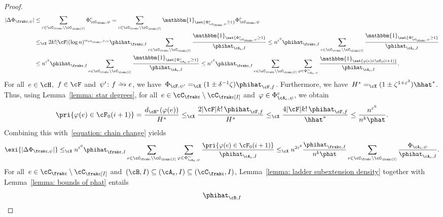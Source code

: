 \documentclass[11pt]{amsart}
\newcommand{\eps}{\varepsilon}
\DeclarePairedDelimiter{\abs}{\lvert}{\rvert}
\newcommand{\ind}{\mathbbm{1}}
\newcommand{\Xleq}{\leq_{\cX}}
\newcommand{\Xeq}{=_{\cX}}
\def\phi{\varphi}
\newcommand{\bijection}{\mathchoice
	{\xrightarrow{\smash{\raisebox{-3pt}{$\scriptstyle\sim$}}}}%
	{\xrightarrow{\smash{\raisebox{-3pt}{$\scriptstyle\sim$}}}}%
	{\xrightarrow{\smash{\raisebox{-2.5pt}{$\scriptscriptstyle\sim$}}}}%
	{\xrightarrow{\smash{\raisebox{-2.5pt}{$\scriptscriptstyle\sim$}}}}%
}
\theoremstyle{definition}
\numberwithin{equation}{section}
\begin{document}
\begin{proof}
\begin{equation}
\begin{aligned}
				\abs{ \Delta\Phi_{\frakc,\psi}}
				&\leq \sum_{e\in \cC_\frakc\setminus \cC_\frakc[I]} \Phi_{\cC_\frakc,\psi}^e
				=\sum_{e\in \cC_\frakc\setminus \cC_\frakc[I]} \ind_{\set{ \Phi_{\cC_\frakc,\psi}^e\geq 1 }}\Phi_{\cC_\frakc,\psi}^e\\
				&\Xleq 2k!\abs{\cF}(\log n)^{\alpha_{\cC_\frakc,I\cup e}}\phihat_{\frakc,I}\sum_{e\in \cC_\frakc\setminus \cC_\frakc[I]} \frac{\ind_{\set{ \Phi_{\cC_\frakc,\psi}^e\geq 1 }}}{\phihat_{\cA_e,I}}
				\leq n^{\eps^6}\phihat_{\frakc,I}\sum_{e\in \cC_\frakc\setminus \cC_\frakc[I]} \frac{\ind_{\set{ \Phi_{\cC_\frakc,\psi}^e\geq 1 }}}{\phihat_{\cA_e,I}}\\
				&\leq n^{\eps^6}\phihat_{\frakc,I}\sum_{e\in \cC_\frakc\setminus \cC_\frakc[I]} \frac{\ind_{\set{ \Phi_{\cA_e,\psi}^e\geq 1 }}}{\phihat_{\cA_e,I}}
				\leq n^{\eps^6}\phihat_{\frakc,I}\sum_{e\in \cC_\frakc\setminus \cC_\frakc[I]} \sum_{\phi\in\Phi^\sim_{\cA_e,\psi}}\frac{\ind_{\set{ \phi(e)\in \cF_0(i+1)  }}}{\phihat_{\cA_e,I}}.
			\end{aligned}
		\end{equation}
		For all~$e\in\cH$,~$f\in\cF$ and~$\psi'\colon f\bijection e$, we have~$\Phi_{\cF,\psi'}\Xeq (1\pm\delta^{-1}\zeta)\phihat_{\cF,f}$.
		Furthermore, we have~$H^*\Xeq (1\pm \zeta^{1+\eps^3})\hhat^*$.
		Thus, using Lemma~\ref{lemma: star degrees}, for all~$e\in\cC_\frakc\setminus\cC_\frakc[I]$ and~$\phi\in\Phi_{\cA_e,\psi}^e$, we obtain
		\begin{equation*}
			\pri{ \phi(e)\in \cF_0(i+1)  }
			=\frac{d_{\cH^*}(\phi(e))}{H^*}
			\Xleq \frac{2\abs{\cF}k!\,\phihat_{\cF,f}}{H^*}
			\Xleq \frac{4\abs{\cF}k!\,\phihat_{\cF,f}}{\hhat^*}
			\leq \frac{n^{\eps^6}}{n^k\phat}.
		\end{equation*}
		Combining this with~\eqref{equation: chain change} yields
		\begin{equation*}
			\exi{\abs{ \Delta\Phi_{\frakc,\psi}}}
			\Xleq n^{\eps^6}\phihat_{\frakc,I}\sum_{e\in \cC_\frakc\setminus \cC_\frakc[I]} \sum_{\phi\in\Phi^\sim_{\cA_e,\psi}}\frac{\pri{ \phi(e)\in \cF_0(i+1)  }}{\phihat_{\cA_e,I}}
			\Xleq n^{2\eps^6}\frac{\phihat_{\frakc,I}}{n^k\phat}\sum_{e\in \cC_\frakc\setminus \cC_\frakc[I]}\frac{\Phi_{\cA_e,\psi}}{\phihat_{\cA_e,I}}.
		\end{equation*}
		For all~$e\in\cC_\frakc\setminus\cC_\frakc[I]$ and~$(\cB,I)\subseteq(\cA_e,I)\subseteq (\cC_\frakc,I)$, Lemma~\ref{lemma: ladder subextension density} together with Lemma~\ref{lemma: bounds of phat} entails
		\begin{equation*}
			\phihat_{\cB,I}

\end{equation*}
\end{proof}
\end{document}
